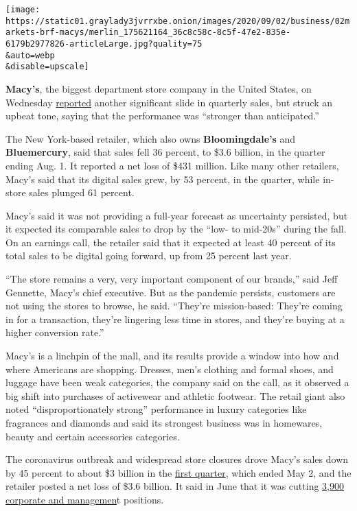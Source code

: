 \texttt{[image: https://static01.graylady3jvrrxbe.onion/images/2020/09/02/business/02markets-brf-macys/merlin\_175621164\_36c8c58c-8c5f-47e2-835e-6179b2977826-articleLarge.jpg?quality=75\\\&auto=webp\\\&disable=upscale]}

\textbf{Macy's}, the biggest department store company in the United
States, on Wednesday
\href{https://www.macysinc.com/investors/news-events/press-releases/detail/1637/macys-inc-reports-second-quarter-2020-results}{reported}
another significant slide in quarterly sales, but struck an upbeat tone,
saying that the performance was ``stronger than anticipated.''

The New York-based retailer, which also owns \textbf{Bloomingdale's} and
\textbf{Bluemercury}, said that sales fell 36 percent, to \$3.6 billion,
in the quarter ending Aug. 1. It reported a net loss of \$431 million.
Like many other retailers, Macy's said that its digital sales grew, by
53 percent, in the quarter, while in-store sales plunged 61 percent.

Macy's said it was not providing a full-year forecast as uncertainty
persisted, but it expected its comparable sales to drop by the ``low- to
mid-20s'' during the fall. On an earnings call, the retailer said that
it expected at least 40 percent of its total sales to be digital going
forward, up from 25 percent last year.

``The store remains a very, very important component of our brands,''
said Jeff Gennette, Macy's chief executive. But as the pandemic
persists, customers are not using the stores to browse, he said.
``They're mission-based: They're coming in for a transaction, they're
lingering less time in stores, and they're buying at a higher conversion
rate.''

Macy's is a linchpin of the mall, and its results provide a window into
how and where Americans are shopping. Dresses, men's clothing and formal
shoes, and luggage have been weak categories, the company said on the
call, as it observed a big shift into purchases of activewear and
athletic footwear. The retail giant also noted ``disproportionately
strong'' performance in luxury categories like fragrances and diamonds
and said its strongest business was in homewares, beauty and certain
accessories categories.

The coronavirus outbreak and widespread store closures drove Macy's
sales down by 45 percent to about \$3 billion in the
\href{https://www.nytimes3xbfgragh.onion/2020/06/02/business/macys-herald-square-protests.html?action=click\&module=RelatedLinks\&pgtype=Article}{first
quarter}, which ended May 2, and the retailer posted a net loss of \$3.6
billion. It said in June that it was cutting
\href{https://www.macysinc.com/investors/news-events/press-releases/detail/1630/macys-inc-announces-restructuring-to-address-sales}{3,900
corporate and managemen}t positions.

